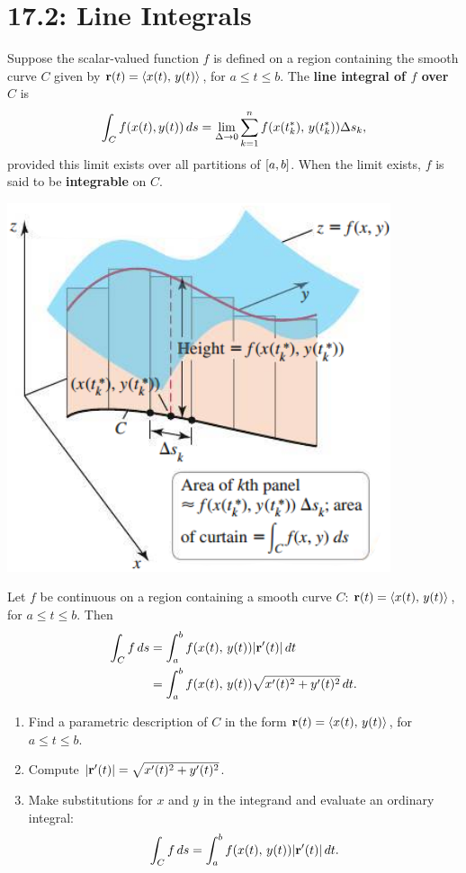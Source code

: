 \documentclass[mathNotesPreamble]{subfiles}
\begin{document}
\section{17.2: Line Integrals}

  \begin{defn*}
    Suppose the scalar-valued function $f$ is defined on a region containing the smooth curve $C$ given by ${\mathbf{r}}(t)= {\left\langle x(t),\,y(t) \right\rangle}$, for $a\leq t\leq b$. The \textbf{line integral of $f$ over $C$} is
      \[\int_C f{\left(x(t), y(t)\right)}\,ds=\lim_{\Delta\to 0} \sum_{k=1}^n f{\left(x(t_k^*),\,y(t_k^*)\right)}\Delta s_k,\]
    provided this limit exists over all partitions of ${\left[a,b\right]}$. When the limit exists, $f$ is said to be \textbf{integrable} on $C$.
  \end{defn*}

  \begin{center}
    \includegraphics[width=0.325\linewidth]{images/briggs_17_02/fig17_17}
  \end{center}

  \begin{thmBox*}
    Let $f$ be continuous on a region containing a smooth curve $C$: ${\mathbf{r}}(t)={\left\langle x(t),\,y(t) \right\rangle}$, for $a\leq t\leq b$. Then
    \begin{align*}
      \int_C f\,ds&= \int_a^b f{\left(x(t),\,y(t)\right)}{\left\vert{\mathbf{r}}'(t)\right\vert}\,dt\\
        &=\int_a^b f{\left(x(t),\,y(t)\right)}\sqrt{x'(t)^2+y'(t)^2}\,dt.
    \end{align*}
  \end{thmBox*}
  \pagebreak

  \begin{thmBox*}
    \begin{enumerate}
      \item 
        Find a parametric description of $C$ in the form ${\mathbf{r}}(t)={\left\langle x(t),\,y(t) \right\rangle}$, for $a\leq t\leq b$.
      \item 
        Compute ${\left\vert{\mathbf{r}}'(t)\right\vert}=\sqrt{x'(t)^2+y'(t)^2}$.
      \item 
        Make substitutions for $x$ and $y$ in the integrand and evaluate an ordinary integral:
          \[\int_C f\,ds = \int_a^b f{\left(x(t),\,y(t)\right)}{\left\vert{\mathbf{r}}'(t)\right\vert}\,dt.\]
    \end{enumerate}
  \end{thmBox*}
\end{document}

